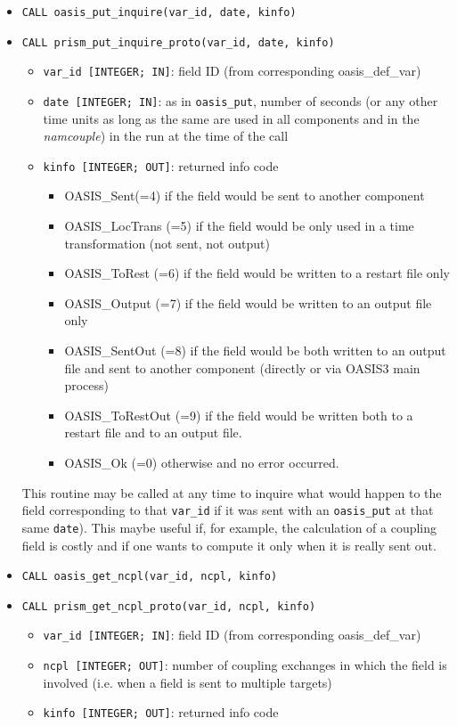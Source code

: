 \begin{itemize}
\item {\tt CALL oasis\_put\_inquire(var\_id, date, kinfo)}
\item {\tt CALL prism\_put\_inquire\_proto(var\_id, date, kinfo)}
  \begin{itemize}
  \item {\tt var\_id [INTEGER; IN]}: field ID (from
  corresponding oasis\_def\_var)
  \item {\tt date [INTEGER; IN]}: as in {\tt oasis\_put}, number of seconds (or any other time
    units as long as the same are used in all components and in the {\it
      namcouple}) in the run at the time of the call
  \item {\tt kinfo [INTEGER; OUT]}: returned info code
    \begin{itemize}
    \item OASIS\_Sent(=4) if the field would be sent to another component
    \item OASIS\_LocTrans (=5) if the field would be only used in a time
      transformation (not sent, not output)
    \item OASIS\_ToRest (=6) if the field would be written to a restart
      file only
    \item OASIS\_Output (=7) if the field would be written to an output
      file only
    \item OASIS\_SentOut (=8) if the field would be both written to an
      output file and sent to another component (directly or via OASIS3
      main process)
    \item OASIS\_ToRestOut (=9) if the field would be written both to a
      restart file and to an output file.
    \item OASIS\_Ok (=0) otherwise and no error occurred.
    \end{itemize}
  \end{itemize}

This routine may be called at any time to
inquire what would happen to the field corresponding to that
{\tt var\_id} if it was sent with an {\tt oasis\_put} at that same {\tt date}). This maybe useful if, for example, the calculation of
a coupling field is costly and if one wants to compute it only when it is
really sent out.

\item {\tt CALL oasis\_get\_ncpl(var\_id, ncpl, kinfo)}
\item {\tt CALL prism\_get\_ncpl\_proto(var\_id, ncpl, kinfo)}
  \begin{itemize}
  \item {\tt var\_id [INTEGER; IN]}: field ID (from
  corresponding oasis\_def\_var)
  \item {\tt ncpl [INTEGER; OUT]}: number of coupling exchanges in which the field
  is involved (i.e. when a field is sent to multiple targets) 
  \item {\tt kinfo [INTEGER; OUT]}: returned info code
  \end{itemize}


\end{itemize}
